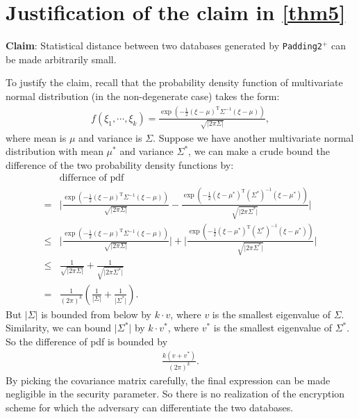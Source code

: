 \chapter{Justification of the claim in \ref{thm5}} \label{Justification of claim P2 1}
\textbf{Claim}: Statistical distance between two databases generated by \texttt{Padding2}$^{+}$ can be made arbitrarily small.

To justify the claim, recall that the probability density function of multivariate normal distribution (in the non-degenerate case) takes the form:
\begin{align*}
	f(\xi_1, \cdots, \xi_k) = \frac{\exp \left( - \frac{1}{2} (\xi - \mu)^{\text{T}} \Sigma^{-1} (\xi - \mu) \right)}{\sqrt{\bigl\lvert 2\pi\Sigma \bigr\rvert}},
\end{align*}
where mean is $\mu$ and variance is $\Sigma$. Suppose we have another multivariate normal distribution with mean $\mu^{*}$ and variance $\Sigma^{*}$, we can make a crude bound the difference of the two probability density functions by:
\begin{align*}
  & \text{differnce of pdf} \\
= & \bigl\lvert \frac{\exp \left( - \frac{1}{2} (\xi - \mu)^{\text{T}} \Sigma^{-1} (\xi - \mu) \right)}{\sqrt{\bigl\lvert 2\pi\Sigma \bigr\rvert}}
- \frac{\exp \left( - \frac{1}{2} (\xi - \mu^{*})^{\text{T}} (\Sigma^{*})^{-1} (\xi - \mu^{*}) \right)}{\sqrt{\bigl\lvert 2\pi\Sigma^{*} \bigr\rvert}} \bigr\rvert \\
\leq & \bigl\lvert \frac{\exp \left( - \frac{1}{2} (\xi - \mu)^{\text{T}} \Sigma^{-1} (\xi - \mu) \right)}{\sqrt{\bigl\lvert 2\pi\Sigma \bigr\lvert}} \bigr\rvert
+ \bigl\lvert \frac{\exp \left( - \frac{1}{2} (\xi - \mu^{*})^{\text{T}} (\Sigma^{*})^{-1} (\xi - \mu^{*}) \right)}{\sqrt{\bigl\lvert 2\pi\Sigma^{*} \bigr\rvert}} \bigr\rvert \\
\leq & \frac{1}{\sqrt{\lvert2\pi\Sigma\rvert}} + \frac{1}{\sqrt{\lvert 2\pi\Sigma^{*} \rvert}} \\
= & \frac{1}{(2\pi)^k} \left( \frac{1}{\lvert \Sigma \rvert} + \frac{1}{\lvert \Sigma^{*} \rvert} \right).
\end{align*}
But $\lvert \Sigma \rvert$ is bounded from below by $k \cdot v$, where $v$ is the smallest eigenvalue of $\Sigma$. Similarity, we can bound $\lvert \Sigma^{*} \rvert$ by $k \cdot v^{*}$, where $v^{*}$ is the smallest eigenvalue of $\Sigma^{*}$. So the difference of pdf is bounded by
\begin{align*}
	\frac{k(v + v^{*})}{(2\pi)^k}.
\end{align*}
By picking the covariance matrix carefully, the final expression can be made negligible in the security parameter. So there is no realization of the encryption scheme for which the adversary can differentiate the two databases.